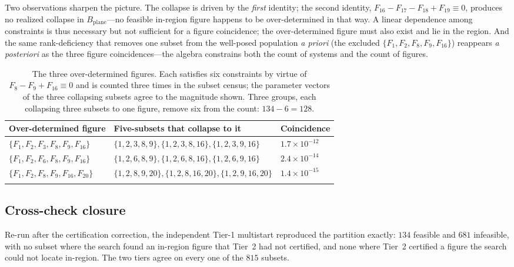 \documentclass[pdflatex,sn-mathphys-num]{sn-jnl}
\newcommand{\Bplane}{B_{\mathrm{plane}}}
\begin{document}
Two observations sharpen the picture. The collapse is driven by the \emph{first} identity; the second identity, $F_{16}-F_{17}-F_{18}+F_{19}\equiv0$, produces no realized collapse in $\Bplane$---no feasible in-region figure happens to be over-determined in that way. A linear dependence among constraints is thus necessary but not sufficient for a figure coincidence; the over-determined figure must also exist and lie in the region. And the same rank-deficiency that removes one subset from the well-posed population \emph{a priori} (the excluded $\{F_1,F_2,F_8,F_9,F_{16}\}$) reappears \emph{a posteriori} as the three figure coincidences---the algebra constrains both the count of systems and the count of figures.

\begin{table}[t]
\caption{The three over-determined figures. Each satisfies six constraints by virtue of $F_8-F_9+F_{16}\equiv0$ and is counted three times in the subset census; the parameter vectors of the three collapsing subsets agree to the magnitude shown. Three groups, each collapsing three subsets to one figure, remove six from the count: $134-6=128$.}\label{tab:overdet}
\begin{tabular}{@{}lll@{}}
\toprule
Over-determined figure & Five-subsets that collapse to it & Coincidence\\
\midrule
$\{F_1,F_2,F_3,F_8,F_9,F_{16}\}$ & $\{1,2,3,8,9\},\{1,2,3,8,16\},\{1,2,3,9,16\}$ & $1.7\times10^{-12}$\\
$\{F_1,F_2,F_6,F_8,F_9,F_{16}\}$ & $\{1,2,6,8,9\},\{1,2,6,8,16\},\{1,2,6,9,16\}$ & $2.4\times10^{-14}$\\
$\{F_1,F_2,F_8,F_9,F_{16},F_{20}\}$ & $\{1,2,8,9,20\},\{1,2,8,16,20\},\{1,2,9,16,20\}$ & $1.4\times10^{-15}$\\
\botrule
\end{tabular}
\end{table}

\subsection{Cross-check closure}\label{subsec:cross-check}

Re-run after the certification correction, the independent Tier-1 multistart reproduced the partition exactly: $134$ feasible and $681$ infeasible, with no subset where the search found an in-region figure that Tier~2 had not certified, and none where Tier~2 certified a figure the search could not locate in-region. The two tiers agree on every one of the $815$ subsets.
\end{document}
